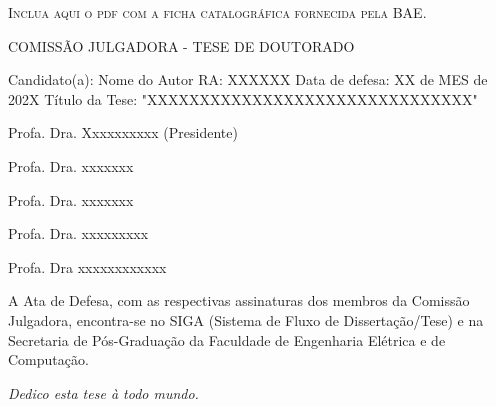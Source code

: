 \imprimircapa
\imprimirfolhaderosto*

\begin{fichacatalografica}
    \vspace*{\fill}
    \begin{center}
        \textsc{Inclua aqui o pdf com a ficha catalográfica fornecida pela BAE.}
    \end{center}
    \vspace*{\fill}
\end{fichacatalografica}

\begin{folhadeaprovacao}
  \begin{center}
    COMISSÃO JULGADORA - TESE DE DOUTORADO
\end{center}
\noindent
\begin{minipage}{\textwidth}\SingleSpacing
Candidato(a): Nome do Autor      RA: XXXXXX
Data de defesa: XX de MES de 202X
Título da Tese: "XXXXXXXXXXXXXXXXXXXXXXXXXXXXXXX"
\vspace{2cm}

Profa. Dra. Xxxxxxxxxx (Presidente)

Profa. Dra. xxxxxxx

Profa. Dra. xxxxxxx

Profa. Dra. xxxxxxxxx

Profa. Dra xxxxxxxxxxxx

\vspace{2cm}

A Ata de Defesa, com as respectivas assinaturas dos membros da Comissão Julgadora, encontra-se no SIGA (Sistema de Fluxo de Dissertação/Tese) e na Secretaria de Pós-Graduação da Faculdade de Engenharia Elétrica e de Computação.
\end{minipage}

\end{folhadeaprovacao}

\begin{dedicatoria}
   \vspace*{\fill}
   \centering
   \noindent
   \textit{ Dedico esta tese à todo mundo.} \vspace*{\fill}
\end{dedicatoria}

